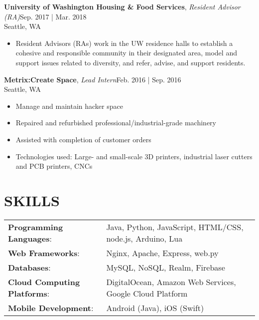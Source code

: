 \documentclass[line,margin]{res}
\begin{document}
\begin{resume}
	\textbf{University of Washington Housing \& Food Services}, {\sl Resident Advisor (RA)}\hfill Sep. 2017 | Mar. 2018\\Seattle, WA\\\begin{itemize} \itemsep 3pt
	\item Resident Advisors (RAs) work in the UW residence halls to establish a cohesive and responsible community in their designated area, model and support issues related to diversity, and refer, advise, and support residents.
	\end{itemize}
	\textbf{Metrix:Create Space}, {\sl Lead Intern}\hfill Feb. 2016 | Sep. 2016\\Seattle, WA\\\begin{itemize} \itemsep 3pt
	\item Manage and maintain hacker space
	\item Repaired and refurbished professional/industrial-grade machinery
	\item Assisted with completion of customer orders
	\item Technologies used: Large- and small-scale 3D printers, industrial laser cutters and PCB printers, CNCs
	\end{itemize}
	\section{SKILLS}
	\begin{tabular}{@{}ll}
		\textbf{Programming Languages}:     & Java, Python, JavaScript, HTML/CSS, node.js, Arduino, Lua \\
		\textbf{Web Frameworks}:            & Nginx, Apache, Express, web.py                            \\
		\textbf{Databases}:                 & MySQL, NoSQL, Realm, Firebase                             \\
		\textbf{Cloud Computing Platforms}: & DigitalOcean, Amazon Web Services, Google Cloud Platform  \\
		\textbf{Mobile Development}:        & Android (Java), iOS (Swift)                               \\
	\end{tabular}

\end{resume}
\end{document}
